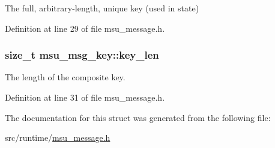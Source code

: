 The full, arbitrary-\/length, unique key (used in state) 



Definition at line 29 of file msu\-\_\-message.\-h.

\hypertarget{structmsu__msg__key_ac144c1faa26d9e6701acb2ef3282e7d5}{
\subsubsection[{key\-\_\-len}]{\setlength{\rightskip}{0pt plus 5cm}size\-\_\-t msu\-\_\-msg\-\_\-key\-::key\-\_\-len}}\label{structmsu__msg__key_ac144c1faa26d9e6701acb2ef3282e7d5}


The length of the composite key. 



Definition at line 31 of file msu\-\_\-message.\-h.



The documentation for this struct was generated from the following file\-:\begin{DoxyCompactItemize}
\item 
src/runtime/\hyperlink{msu__message_8h}{msu\-\_\-message.\-h}\end{DoxyCompactItemize}
